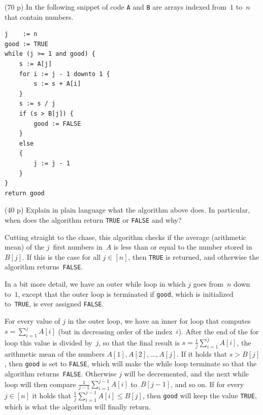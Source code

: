 \documentclass{jn-pset}
\begin{document}

\begin{problem}%
  \label{problem:code-snippet-2}%
  (70 p)
  In the following snippet of code \verb+A+ and \verb+B+ are arrays
  indexed from~$1$ to~$n$ that contain numbers.
\begin{verbatim}
j    := n
good := TRUE
while (j >= 1 and good) {
    s := A[j]
    for i := j - 1 downto 1 {
        s := s + A[i]
    }
    s := s / j
    if (s > B[j]) {
        good := FALSE
    }
    else
    {
        j := j - 1
    }
}
return good
\end{verbatim}

  \begin{subproblem}%
    {(40 p)}
    {\ignorespaces}
  Explain in plain language what the algorithm above does.
  In particular, when does the algorithm return
  \verb+TRUE+
  or
  \verb+FALSE+
  and why?
\end{subproblem}

\begin{solution}
  Cutting straight to the chase, this algorithm checks if the
  average (\ie arithmetic mean) of the $j$~first numbers in~$A$
  is less than or equal to the number stored in~$B[j]$.
  If this is the case for all $j \in [n]$,
  then \verb+TRUE+ is returned, and otherwise the
  algorithm returns~\verb+FALSE+.

  In a bit more detail, we have an outer while loop in which
  $j$ goes from~$n$ down to~$1$, except that the outer loop is
  terminated
  if \verb+good+, which is initialized to~\verb+TRUE+,
  is ever assigned \verb+FALSE+.

  For every value of $j$ in the outer loop, 
  we have an inner for loop  that computes
  $s = \sum_{i=1}^{j} A[i]$
  (but in decreasing order of the index~$i$).
  After the end of the for loop this value is divided by~$j$, so that
  the final result is
  $s = \frac{1}{j} \sum_{i=1}^{j} A[i]$,
  \ie the arithmetic mean of the numbers
  $ A[1], A[2],\ldots, A[j] $.
  If it holds that
  $s > B[j]$,
  then
  \verb+good+ is set to 
  \verb+FALSE+, which will make the while loop terminate so that the
  algorithm returns~\verb+FALSE+.
  Otherwise $j$ will be decremented, and the next while loop will then compare
  $\frac{1}{j-1} \sum_{i=1}^{j-1} A[i]$
  to~$B[j-1]$, and so on.
  If for every $j \in [n]$ it holds that
  $\frac{1}{j} \sum_{i=1}^{j-1} A[i] \leq B[j]$,
  then
  \verb+good+ will keep the value \verb+TRUE+,
  which is what the algorithm will finally return.  
\end{solution}



\end{problem}
\end{document}
